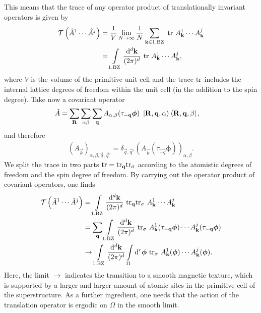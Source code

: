 \documentclass[
    aps,
    prb,
    twocolumn,
    floatfix,
    superscriptaddress,
	10pt
]{revtex4-2}
\begin{document}
This means that the trace of any operator product of translationally invariant operators is given by
\begin{align}
\mathcal{T} \left( \hat{A}^1 \cdots  \hat{A}^j \right) &=
\frac{1}{V}
\lim\limits_{N\to \infty}	\frac{1}{N} \sum_{\mathbf{k} \in \mathrm{1.BZ}} ~ \mathrm{tr}~ A^1_{\mathbf{k}} \cdots A^j_{\mathbf{k}}
\notag \\
& =   \int\limits_{\mathrm{1.BZ}}  \frac{\mathrm{d}^d \mathbf{k}}{(2\pi)^d}~ \mathrm{tr}~ A^1_{\mathbf{k}} \cdots A^j_{\mathbf{k}},
\end{align}
where $V$ is the volume of the primitive unit cell and the trace $\mathrm{tr}$ includes the internal lattice degrees of freedom within the unit cell (in the addition to the spin degree).
Take now a covariant operator
\begin{align}
	\hat{A} &=
	\sum_{\mathbf{R}} \sum_{\alpha\beta}
	\sum_{\mathbf{q} }  A_{\alpha,\beta}( \tau_{\mathbf{-q}}\boldsymbol{\phi})~ \ket{\mathbf{R},\mathbf{q}, \alpha}\bra{\mathbf{R},\mathbf{q}, \beta} ,
\end{align}
and therefore
\begin{align}
	(A_{\vec{k}})_{ \alpha, \beta, \vec{q}, \vec{q}'}
	= \delta_{\vec{q}, \vec{q}'} (A_{\vec{k}}( \tau_\vec{-q}\boldsymbol{\phi}))_{ \alpha, \beta} . 
\end{align}
We split the trace in two parts $\mathrm{tr} = \mathrm{tr}_{\mathbf{q}} \mathrm{tr}_{\sigma} $ according to the atomistic degrees of freedom and the spin degree of freedom. 
By carrying out the operator product of covariant operators, one finds
\begin{align}
	\mathcal{T} \left( \hat{A}^1 \cdots  \hat{A}^j \right) & =   \int\limits_{\mathrm{1.BZ}}\frac{\mathrm{d}^d \mathbf{k}}{(2\pi)^d}~ \mathrm{tr}_{\mathbf{q}} \mathrm{tr}_\sigma ~ A^1_{\mathbf{k}} \cdots A^j_{\mathbf{k}}
	\notag \\
	&=
 \sum_{\mathbf{q}}\int\limits_{\mathrm{1.BZ}} \frac{\mathrm{d}^d \mathbf{k}}{(2\pi)^d}~ \mathrm{tr}_\sigma ~ A^1_{\mathbf{k}}( \tau_{\mathbf{-q}}\boldsymbol{\phi})\cdots A^j_{\mathbf{k}}( \tau_{\mathbf{-q}}\boldsymbol{\phi})
	\notag \\
	&  
	\to
	\int\limits_{\mathrm{1.BZ}} \frac{\mathrm{d}^d \mathbf{k}}{(2\pi)^d} \int \limits_{\Omega}\mathrm{d}^r \boldsymbol{\phi}~ \mathrm{tr}_\sigma ~ A^1_{\mathbf{k}}( \boldsymbol{\phi})\cdots A^j_{\mathbf{k}}( \boldsymbol{\phi}) .
	\end{align}
Here, the limit $\to$ indicates the transition to a smooth magnetic texture, which is supported by a larger and larger amount of atomic sites in the primitive cell of the superstructure.
As a further ingredient, one needs that the action of the translation operator is ergodic on $\Omega$ in the smooth limit.
\end{document}
